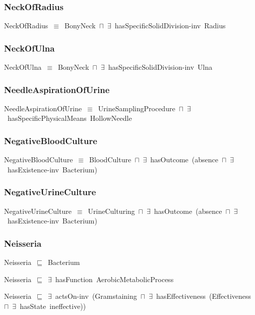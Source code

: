 \documentclass{article}
\begin{document}
\subsubsection*{NeckOfRadius}

NeckOfRadius~\ensuremath{\equiv}~BonyNeck~\ensuremath{\sqcap}~\ensuremath{\exists}~hasSpecificSolidDivision-inv~Radius

\subsubsection*{NeckOfUlna}

NeckOfUlna~\ensuremath{\equiv}~BonyNeck~\ensuremath{\sqcap}~\ensuremath{\exists}~hasSpecificSolidDivision-inv~Ulna

\subsubsection*{NeedleAspirationOfUrine}

NeedleAspirationOfUrine~\ensuremath{\equiv}~UrineSamplingProcedure~\ensuremath{\sqcap}~\ensuremath{\exists}~hasSpecificPhysicalMeans~HollowNeedle

\subsubsection*{NegativeBloodCulture}

NegativeBloodCulture~\ensuremath{\equiv}~BloodCulture~\ensuremath{\sqcap}~\ensuremath{\exists}~hasOutcome~(absence~\ensuremath{\sqcap}~\ensuremath{\exists}~hasExistence-inv~Bacterium)

\subsubsection*{NegativeUrineCulture}

NegativeUrineCulture~\ensuremath{\equiv}~UrineCulturing~\ensuremath{\sqcap}~\ensuremath{\exists}~hasOutcome~(absence~\ensuremath{\sqcap}~\ensuremath{\exists}~hasExistence-inv~Bacterium)

\subsubsection*{Neisseria}

Neisseria~\ensuremath{\sqsubseteq}~Bacterium~

Neisseria~\ensuremath{\sqsubseteq}~\ensuremath{\exists}~hasFunction~AerobicMetabolicProcess~

Neisseria~\ensuremath{\sqsubseteq}~\ensuremath{\exists}~actsOn-inv~(Gramstaining~\ensuremath{\sqcap}~\ensuremath{\exists}~hasEffectiveness~(Effectiveness~\ensuremath{\sqcap}~\ensuremath{\exists}~hasState~ineffective))~
\end{document}
